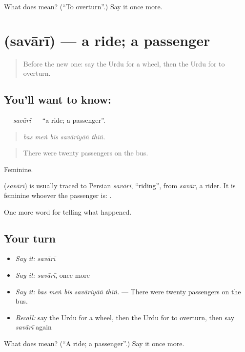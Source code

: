 \begin{tcolorbox}[breakable,colback=teal!4,colframe=teal!35!black,title={Before you move on}]
What does  mean? (\textquotedblleft{}To overturn\textquotedblright{}.) Say it once more.
\end{tcolorbox}
\section[\texorpdfstring{\ur{سواری} (savārī)}{سواری (savārī)}]{ (savārī) — a ride; a passenger}

\label{lesson:UR-C284-savari}



\begin{quote}
Before the new one: say the Urdu for a wheel, then the Urdu for to overturn.
\end{quote}

\subsection*{You'll want to know: }
\textbf{} — \emph{savārī} — \textquotedblleft{}a ride; a passenger\textquotedblright{}.

\begin{quote}
    
\end{quote}

\begin{quote}
\emph{bas meṅ bīs savāriyāṅ thīṅ.}
\end{quote}

\begin{quote}
There were twenty passengers on the bus.
\end{quote}

Feminine.

\begin{cousinweb}
\textbf{} (\emph{savārī}) is usually traced to Persian \emph{savārī}, \textquotedblleft{}riding\textquotedblright{}, from \emph{savār}, a rider. It is feminine whoever the passenger is: \textbf{ }.
\end{cousinweb}

\begin{grammarlens}[title={What you've built}]
One more word for telling what happened.
\end{grammarlens}

\subsection*{Your turn}
\begin{itemize}
\raggedright
  \item \emph{Say it:} \emph{savārī}
  \item \emph{Say it:} \emph{savārī}, once more
  \item \emph{Say it:} \emph{bas meṅ bīs savāriyāṅ thīṅ.} — There were twenty passengers on the bus.
  \item \emph{Recall:} say the Urdu for a wheel, then the Urdu for to overturn, then say \emph{savārī} again
\end{itemize}

\begin{tcolorbox}[breakable,colback=teal!4,colframe=teal!35!black,title={Before you move on}]
What does  mean? (\textquotedblleft{}A ride; a passenger\textquotedblright{}.) Say it once more.
\end{tcolorbox}
